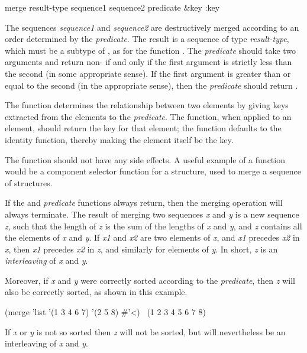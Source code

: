 \begin{defun}[Function]
merge result-type sequence1 sequence2 predicate &key :key

The sequences {\it sequence1} and {\it sequence2} are destructively
merged according to an order determined by
the {\it predicate}.  The result is a sequence of type {\it result-type},
which must be a subtype of , as for the function .
The {\it predicate} should take two
arguments and return non-{\false} if and only if the first argument is
strictly less than the second (in some appropriate sense). 
If the first argument is greater than or equal to the second
(in the appropriate sense), then the {\it predicate} should return {\false}.

The  function determines the relationship between two elements
by giving keys extracted from the elements to the {\it predicate}.
The  function, when applied to an element, should return
the key for that element; the  function defaults to the identity
function, thereby making the element itself be the key.

The  function should not have any side effects.
A useful example of a  function would be a component
selector function for a  structure, used to merge
a sequence of structures.

If the  and {\it predicate} functions always return, then the
merging operation will always terminate.
The result of merging two sequences {\it x} and {\it y} is a new sequence
{\it z}, such that the length of {\it z} is the sum of the lengths of {\it x}
and {\it y}, and {\it z} contains all the elements of {\it x} and {\it y}.
If {\it x1} and {\it x2} are two elements of {\it x}, and {\it x1} precedes
{\it x2} in {\it x}, then {\it x1} precedes {\it x2} in {\it z}, and similarly for
elements of {\it y}.  In short, {\it z} is an {\it interleaving} of {\it x}
and {\it y}.

Moreover, if {\it x} and {\it y} were correctly sorted according to the
{\it predicate}, then {\it z} will also be correctly sorted,
as shown in this example.
\begin{lisp}
(merge 'list '(1 3 4 6 7) '(2 5 8) \#'<) \EV\ (1 2 3 4 5 6 7 8)
\end{lisp}
If {\it x} or {\it y} is not so sorted then {\it z} will not be sorted,
but will nevertheless be an interleaving of {\it x} and {\it y}.


\end{defun}
